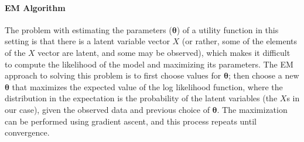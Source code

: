 
\vspace{\up}
\paragraph{EM Algorithm}

The problem with estimating the parameters ($\bm{\theta}$) of a
utility function in this setting is that there is a latent variable vector $X$ (or
rather, some of the elements of the $X$ vector are latent, and some
may be observed), which makes it difficult to compute the
likelihood of the model and maximizing its parameters.  The EM
approach to solving this problem is to first choose values for
$\bm{\theta}$; then choose a new $\bm{\theta}$ that maximizes the
expected value of the log likelihood function, where the distribution
in the expectation is the probability of the latent variables (the
$X$s in our case), given the observed data and previous choice of
$\bm{\theta}$. The maximization can be performed using gradient
ascent, and this process repeats until convergence.

